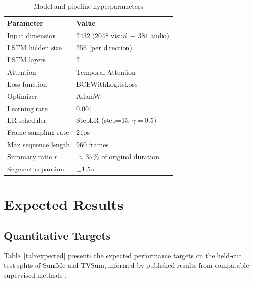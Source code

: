 \documentclass[12pt, a4paper]{report}
\begin{document}
\begin{table}[H]
\centering
\caption{Model and pipeline hyperparameters}
\label{tab:hyperparams}
\begin{tabular}{ll}
  \toprule
  \textbf{Parameter} & \textbf{Value} \\
  \midrule
  Input dimension      & 2432 (2048 visual + 384 audio) \\
  LSTM hidden size     & 256 (per direction) \\
  LSTM layers          & 2 \\
  Attention            & Temporal Attention \\
  Loss function        & BCEWithLogitsLoss \\
  Optimizer            & AdamW \\
  Learning rate        & 0.001 \\
  LR scheduler         & StepLR (step=15, $\gamma=0.5$) \\
  Frame sampling rate  & 2\,fps \\
  Max sequence length  & 960 frames \\
  Summary ratio $r$    & $\approx 35\,\%$ of original duration \\
  Segment expansion    & $\pm 1.5$\,s \\
  \bottomrule
\end{tabular}
\end{table}

\chapter{Expected Results}

\section{Quantitative Targets}

Table~\ref{tab:expected} presents the expected performance targets on the held-out
test splits of SumMe and TVSum, informed by published results from comparable
supervised methods \cite{apostolidis2021,zhang2016}.
\end{document}

